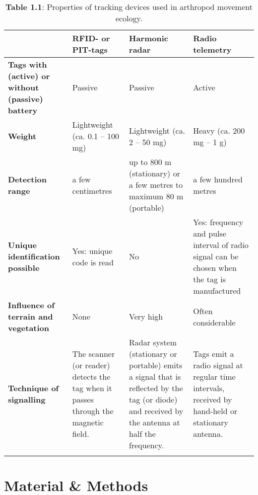 \documentclass[10pt, twoside]{book} %
\begin{document}
	\begin{table}[h!]
		\begin{center}
			\begin{footnotesize}
				\caption*{\textbf{Table 1.1}: Properties of tracking devices used in arthropod movement ecology.} \label{Tab1.1}
				\begingroup
				\setlength{\tabcolsep}{6pt} %
				\renewcommand{\arraystretch}{1.5} %
				\begin{tabular}{p{3cm} p{2.8cm} p{2.8cm} p{2.8cm}}
					
					\toprule
					& \textbf{RFID- or PIT-tags} & \textbf{Harmonic radar} & \textbf{Radio telemetry} \\
					\midrule
					\textbf{Tags with (active) or without (passive) battery} & Passive & Passive & Active \\
					\arrayrulecolor{black!30}\midrule[0.3pt]
					\textbf{Weight} & Lightweight (ca. 0.1 -- 100 mg) & Lightweight (ca. 2 -- 50 mg) & Heavy (ca. 200 mg -- 1 g)\\
					\arrayrulecolor{black!30}\midrule[0.3pt]
					\textbf{Detection range} & a few centimetres & up to 800 m (stationary) or a few metres to maximum 80 m (portable) & a few hundred metres\\
					\arrayrulecolor{black!30}\midrule[0.3pt]
					\textbf{Unique identification possible} & Yes: unique code is read & No & Yes: frequency and pulse interval of radio signal can be chosen when the tag is manufactured\\
					\arrayrulecolor{black!30}\midrule[0.3pt]
					\textbf{Influence of terrain and vegetation} & None & Very high & Often considerable\\
					\textbf{Technique of signalling} & The scanner (or reader) detects the tag when it passes through the magnetic field. & Radar system (stationary or portable) emits a signal that is reflected by the tag (or diode) and received by the antenna at half the frequency. & Tags emit a radio signal at regular time intervals, received by hand-held or stationary antenna.\\
					\arrayrulecolor{black}\bottomrule
				\end{tabular}\endgroup
			\end{footnotesize}
		\end{center}
	\end{table}
	\vspace*{\fill}
	\clearpage

	\section{Material \& Methods}
\end{document}
